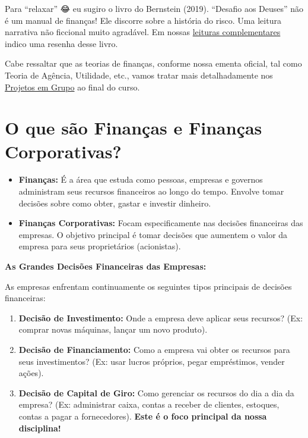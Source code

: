 \documentclass[
  a4paper,
]{book}
\begin{document}
Para ``relaxar'' 😂 eu sugiro o livro do Bernstein (2019). ``Desafio aos
Deuses'' não é um manual de finanças! Ele discorre sobre a história do
risco. Uma leitura narrativa não ficcional muito agradável. Em nossas
\href{https://fccp.phdpablo.com/00-schedule.html}{leituras
complementares} indico uma resenha desse livro.

Cabe ressaltar que as teorias de finanças, conforme nossa ementa
oficial, tal como Teoria de Agência, Utilidade, etc., vamos tratar mais
detalhadamente nos
\href{https://fccp.phdpablo.com/06-aval.html}{Projetos em Grupo} ao
final do curso.

\section{\texorpdfstring{\textbf{O que são Finanças e Finanças
Corporativas?}}{O que são Finanças e Finanças Corporativas?}}\label{o-que-suxe3o-finanuxe7as-e-finanuxe7as-corporativas}

\begin{itemize}
\item
  \textbf{Finanças:} É a área que estuda como pessoas, empresas e
  governos administram seus recursos financeiros ao longo do tempo.
  Envolve tomar decisões sobre como obter, gastar e investir dinheiro.
\item
  \textbf{Finanças Corporativas:} Focam especificamente nas decisões
  financeiras das empresas. O objetivo principal é tomar decisões que
  aumentem o valor da empresa para seus proprietários (acionistas).
\end{itemize}

\textbf{As Grandes Decisões Financeiras das Empresas:}

As empresas enfrentam continuamente os seguintes tipos principais de
decisões financeiras:

\begin{enumerate}
\def\labelenumi{\arabic{enumi}.}
\item
  \textbf{Decisão de Investimento:} Onde a empresa deve aplicar seus
  recursos? (Ex: comprar novas máquinas, lançar um novo produto).
\item
  \textbf{Decisão de Financiamento:} Como a empresa vai obter os
  recursos para seus investimentos? (Ex: usar lucros próprios, pegar
  empréstimos, vender ações).
\item
  \textbf{Decisão de Capital de Giro:} Como gerenciar os recursos do dia
  a dia da empresa? (Ex: administrar caixa, contas a receber de
  clientes, estoques, contas a pagar a fornecedores). \textbf{Este é o
  foco principal da nossa disciplina!}
\end{enumerate}
\end{document}
